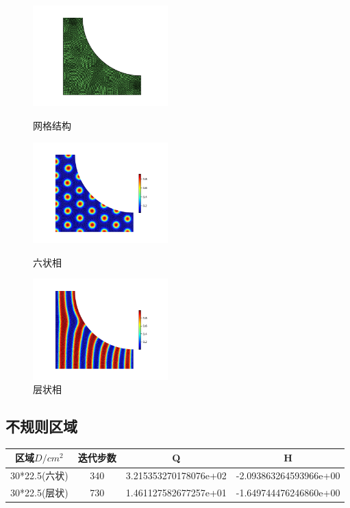 \documentclass[12pt]{article}
\begin{document}
\begin{CJK}{UTF8}{gkai}
\begin{figure}[H]
	\setlength{\abovecaptionskip}{0.cm}
	\setlength{\belowcaptionskip}{-0.cm}
	\begin{minipage}[!htbp]{0.3\linewidth}
		\includegraphics[width=5.2cm]{Figure_L.png}
		\caption*{网格结构}
	\end{minipage}
	\hspace{0.23in}
	\begin{minipage}[!htbp]{0.3\linewidth}
		\includegraphics[width=5.2cm]{scftfigure312.png}
		\caption*{六状相}
	\end{minipage}
	\hspace{0.23in}
	\begin{minipage}[!htbp]{0.3\linewidth}
		\includegraphics[width=5.2cm]{scftfigure1004.png}
		\caption*{层状相}
	\end{minipage}
\end{figure}
\subsection{不规则区域}   
\begin{table}[H]
	\centering
	\begin{tabular}{cccc}
		\toprule
		区域$D/cm^2$ &	迭代步数 & Q &  H \\
		\midrule
		30*22.5(六状)&340& 3.215353270178076e+02 & -2.093863264593966e+00\\
		30*22.5(层状)&730 &1.461127582677257e+01 & -1.649744476246860e+00\\
		\bottomrule
	\end{tabular}
\end{table}


\end{CJK}
\end{document}

